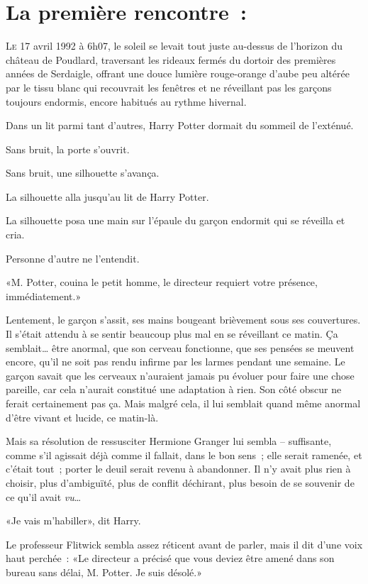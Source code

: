 
\section{La première rencontre~:}

\lettrine{L}{e} 17 avril 1992 à 6h07, le soleil se levait tout juste au-dessus de l'horizon du château de Poudlard, traversant les rideaux fermés du dortoir des premières années de Serdaigle, offrant une douce lumière rouge-orange d'aube peu altérée par le tissu blanc qui recouvrait les fenêtres et ne réveillant pas les garçons toujours endormis, encore habitués au rythme hivernal.

Dans un lit parmi tant d'autres, Harry Potter dormait du sommeil de l'exténué.

Sans bruit, la porte s'ouvrit.

Sans bruit, une silhouette s'avança.

La silhouette alla jusqu'au lit de Harry Potter.

La silhouette posa une main sur l'épaule du garçon endormit qui se réveilla et cria.

Personne d'autre ne l'entendit.

«M. Potter, couina le petit homme, le directeur requiert votre présence, immédiatement.»

Lentement, le garçon s'assit, ses mains bougeant brièvement sous ses couvertures. Il s'était attendu à se sentir beaucoup plus mal en se réveillant ce matin. Ça semblait… être anormal, que son cerveau fonctionne, que ses pensées se meuvent encore, qu'il ne soit pas rendu infirme par les larmes pendant une semaine. Le garçon savait que les cerveaux n'auraient jamais pu évoluer pour faire une chose pareille, car cela n'aurait constitué une adaptation à rien. Son côté obscur ne ferait certainement pas ça. Mais malgré cela, il lui semblait quand même anormal d'être vivant et lucide, ce matin-là.

Mais sa résolution de ressusciter Hermione Granger lui sembla -- suffisante, comme s'il agissait déjà comme il fallait, dans le bon sens~; elle serait ramenée, et c'était tout~; porter le deuil serait revenu à abandonner. Il n'y avait plus rien à choisir, plus d'ambiguïté, plus de conflit déchirant, plus besoin de se souvenir de ce qu'il avait \emph{vu}…

«Je vais m'habiller», dit Harry.

Le professeur Flitwick sembla assez réticent avant de parler, mais il dit d'une voix haut perchée~: «Le directeur a précisé que vous deviez être amené dans son bureau sans délai, M. Potter. Je suis désolé.»

